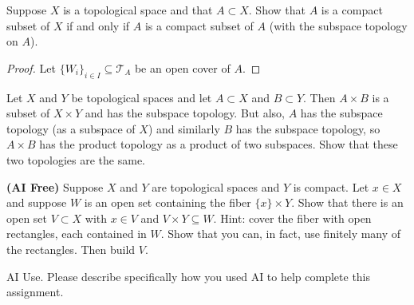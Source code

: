 \documentclass[minion]{homework}
\begin{document}
\begin{problems}
\problem Suppose $X$ is a topological space and that $A\subset X$.
Show that $A$ is a compact subset of $X$ if and only if $A$ is a compact 
subset of $A$ (with the subspace topology on $A$).
\newline
\begin{proof}
  Let $\{W_i\}_{i \in I} \subseteq \mathcal{T}_A$ be an open cover of $A$.
\end{proof}

\problem Let $X$ and $Y$ be topological spaces and let $A\subset X$ and $B\subset Y$.
Then $A\times B$ is a subset of $X\times Y$ and has the subspace topology.
But also, $A$ has the subspace topology (as a subspace of $X$) and similarly 
$B$ has the subspace topology, so $A\times B$ has the product topology 
as a product of two subspaces.  Show that these two topologies are the same.

\problem \textbf{(AI Free)}
Suppose $X$ and $Y$ are topological spaces and $Y$ is compact. Let $x\in X$
and suppose $W$ is an open set containing the fiber $\{x\}\times Y$.
Show that there is an open set $V\subset X$ with $x\in V$ and $V\times Y\subseteq W$.
Hint: cover the fiber with open rectangles, each contained in $W$.  Show that
you can, in fact, use finitely many of the rectangles.  Then build $V$.

\problem AI Use. Please describe specifically how you used AI to help complete this assignment.

\end{problems}
\end{document}

